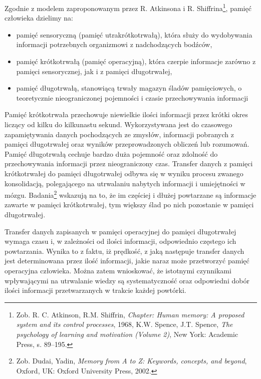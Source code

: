 \documentclass{pracamgr}
\begin{document}
Zgodnie z modelem zaproponowanym przez R. Atkinsona i R. Shiffrina\footnote{Zob. R. C. Atkinson, R.M. Shiffrin, \textit{Chapter: Human memory: A proposed system and its control processes}, 1968, K.W. Spence, J.T. Spence, \textit{The psychology of learning and motivation (Volume 2)}, New York: Academic Press, s. 89–195.}, pamięć człowieka dzielimy na:
\begin{itemize}
\item pamięć sensoryczną (pamięć utrakrótkotrwałą), która służy do wydobywania informacji potrzebnych organizmowi z nadchodzących bodźców,
\item pamięć krótkotrwałą (pamięć operacyjną), która czerpie informacje zarówno z pamięci sensorycznej, jak i z pamięci długotrwałej,
\item pamięć długotrwałą, stanowiącą trwały magazyn śladów pamięciowych, o teoretycznie nieograniczonej pojemności i czasie przechowywania informacji
\end{itemize}  
Pamięć krótkotrwała przechowuje niewielkie ilości informacji przez krótki okres liczący od kilku do kilkunastu sekund. Wykorzystywana jest do czasowego zapamiętywania danych pochodzących ze zmysłów, informacji pobranych z pamięci długotrwałej oraz wyników przeprowadzonych obliczeń lub rozumowań. Pamięć długotrwałą cechuje bardzo duża pojemność oraz zdolność do przechowywania informacji przez nieograniczony czas. Transfer danych z pamięci krótkotrwałej do pamięci długotrwałej odbywa się w wyniku procesu zwanego konsolidacją, polegającego na utrwalaniu nabytych informacji i umiejętności w mózgu. Badania\footnote{Zob. Dudai, Yadin, \textit{Memory from A to Z: Keywords, concepts, and beyond}, Oxford, UK: Oxford University Press, 2002.} wskazują na to, że im częściej i dłużej powtarzane są informacje zawarte w pamięci krótkotrwałej, tym większy ślad po nich pozostanie w pamięci długotrwałej.

Transfer danych zapisanych w pamięci operacyjnej do pamięci długotrwałej wymaga czasu i, w zależności od ilości informacji, odpowiednio częstego ich powtarzania. Wynika to z faktu, iż prędkość, z jaką następuje transfer danych jest determinowana przez ilość informacji, jakie naraz może przetworzyć pamięć operacyjna człowieka. Można zatem wnioskować, że istotnymi czynnikami wpływającymi na utrwalanie wiedzy są systematyczność oraz odpowiedni dobór ilości informacji przetwarzanych w trakcie każdej powtórki.
\end{document}
